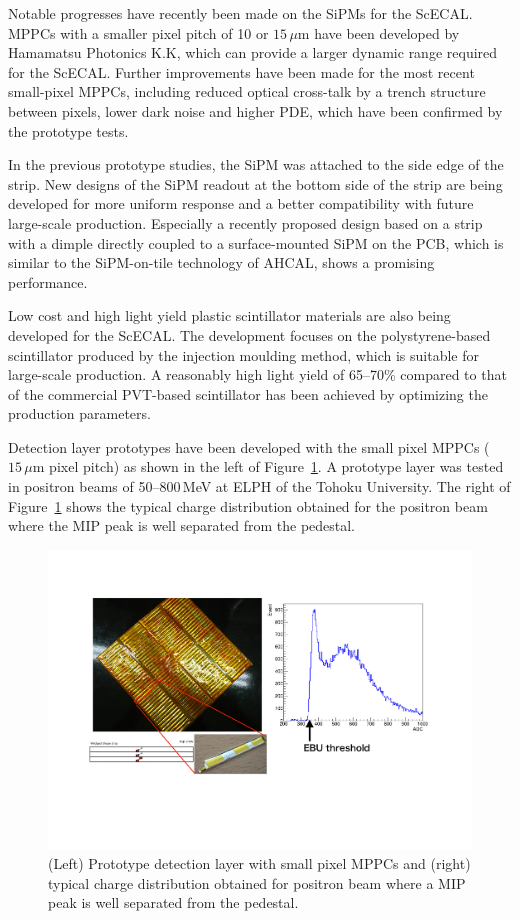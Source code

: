 Notable progresses have recently been made on the SiPMs for the ScECAL. 
MPPCs with a smaller pixel pitch of 10 or $15\,\mu\mathrm{m}$ have been developed 
by Hamamatsu Photonics K.K, which can provide a larger dynamic range required 
for the ScECAL\cite{ild:bib:hdmppc}. 
Further improvements have been made for the most recent small-pixel MPPCs, 
including reduced optical cross-talk by a trench structure between pixels, 
lower dark noise and higher PDE, which have been confirmed by the prototype tests.

In the previous prototype studies, the SiPM was attached to the side edge 
of the strip. 
New designs of the SiPM readout at the bottom side of the strip 
are being developed for more uniform response and a better compatibility 
with future large-scale production.
Especially a recently proposed design based on a strip 
with a dimple directly coupled to a surface-mounted SiPM on the PCB, 
which is similar to the SiPM-on-tile technology of AHCAL,
shows a promising performance.

Low cost and high light yield plastic scintillator materials are also being developed 
for the ScECAL.
The development focuses on the polystyrene-based scintillator 
produced by the injection moulding method, which is suitable 
for large-scale production. 
A reasonably high light yield of 65--70\% compared to that of 
the commercial PVT-based scintillator has been achieved 
by optimizing the production parameters. 

Detection layer prototypes have been developed 
with the small pixel MPPCs ($15\,\mu\mathrm{m}$ pixel pitch) 
as shown in the left of Figure~\ref{fig:det:ScWECAL_prototype}.
A prototype layer was tested in positron beams of 50--800\,MeV 
at ELPH of the Tohoku University.
The right of Figure~\ref{fig:det:ScWECAL_prototype} shows the typical charge distribution 
obtained for the positron beam where the MIP peak is well separated 
from the pedestal.

\begin{figure}[htb]
\centering
\includegraphics[width=1.0\hsize]{Detector/fig/ScWECAL_prototype.pdf}
\caption{(Left) Prototype detection layer with small pixel MPPCs  
   and (right) typical charge distribution obtained for positron beam 
where a MIP peak is well separated from the pedestal.}
\label{fig:det:ScWECAL_prototype}
\end{figure}



